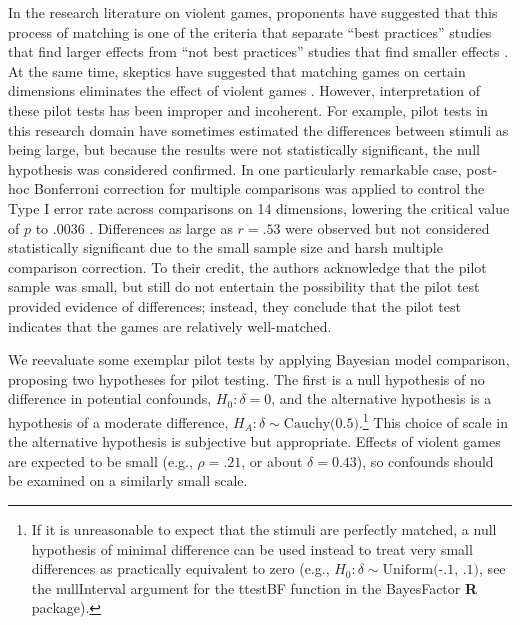 \documentclass[man]{apa6}
\begin{document}

In the research literature on violent games, proponents have suggested that this process of matching is one of the criteria that separate ``best practices'' studies that find larger effects from ``not best practices'' studies that find smaller effects \citep{Anderson:etal:2010}. At the same time, skeptics have suggested that matching games on certain dimensions eliminates the effect of violent games \citep{Adachi:Willoughby:2011}. However, interpretation of these pilot tests has been improper and incoherent. For example, pilot tests in this research domain have sometimes estimated the differences between stimuli as being large, but because the results were not statistically significant, the null hypothesis was considered confirmed. In one particularly remarkable case, post-hoc Bonferroni correction for multiple comparisons was applied to control the Type I error rate across comparisons on 14 dimensions, lowering the critical value of $p$ to .0036 \citep{Arriaga:etal:2008}. Differences as large as $r = .53$ were observed but not considered statistically significant due to the small sample size and harsh multiple comparison correction. To their credit, the authors acknowledge that the pilot sample was small, but still do not entertain the possibility that the pilot test provided evidence of differences; instead, they conclude that the pilot test indicates that the games are relatively well-matched.

We reevaluate some exemplar pilot tests by applying Bayesian model comparison, proposing two hypotheses for pilot testing. The first is a null hypothesis of no difference in potential confounds, $H_0: \delta{} = 0$, and the alternative hypothesis is a hypothesis of a moderate difference, $H_A: \delta{} \sim{} \mbox{Cauchy(0.5)}$.\footnote{If it is unreasonable to expect that the stimuli are perfectly matched, a null hypothesis of minimal difference can be used instead to treat very small differences as practically equivalent to zero (e.g., $H_0: \delta{} \sim{} \mbox{Uniform(-.1, .1)}$, see the nullInterval argument for the ttestBF function in the BayesFactor {\bf R} package).} This choice of scale in the alternative hypothesis is subjective but appropriate. Effects of violent games are expected to be small (e.g., $\rho = .21$, or about $\delta = 0.43$), so confounds should be examined on a similarly small scale. 
\end{document}
